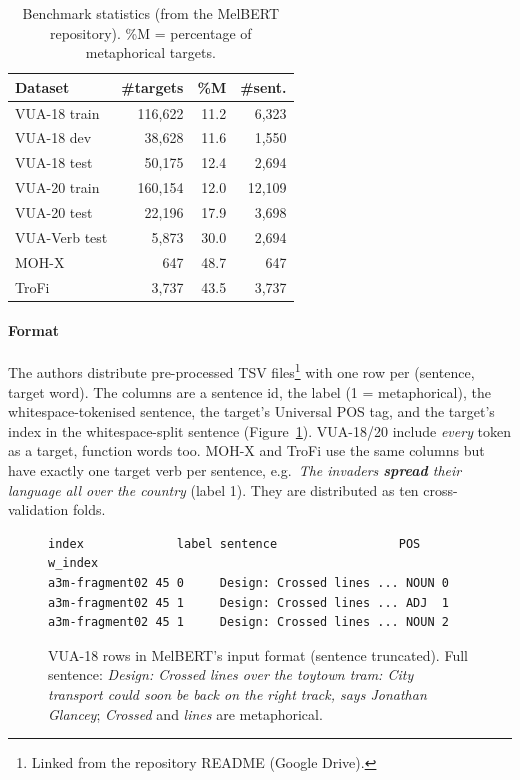 \documentclass[11pt]{article}
\begin{document}
\begin{table}[t]
\centering\small
\begin{tabular}{lrrr}
\toprule
Dataset & \#targets & \%M & \#sent. \\
\midrule
VUA-18 train & 116,622 & 11.2 & 6,323 \\
VUA-18 dev & 38,628 & 11.6 & 1,550 \\
VUA-18 test & 50,175 & 12.4 & 2,694 \\
VUA-20 train & 160,154 & 12.0 & 12,109 \\
VUA-20 test & 22,196 & 17.9 & 3,698 \\
VUA-Verb test & 5,873 & 30.0 & 2,694 \\
MOH-X & 647 & 48.7 & 647 \\
TroFi & 3,737 & 43.5 & 3,737 \\
\bottomrule
\end{tabular}
\caption{Benchmark statistics (from the MelBERT repository). \%M = percentage of metaphorical targets.}
\label{tab:origstats}
\end{table}

\paragraph{Format} The authors distribute pre-processed TSV files\footnote{Linked from the repository README (Google Drive).} with one row per (sentence, target word). The columns are a sentence id, the label (1 = metaphorical), the whitespace-tokenised sentence, the target's Universal POS tag, and the target's index in the whitespace-split sentence (Figure~\ref{fig:vuasnippet}). VUA-18/20 include \emph{every} token as a target, function words too. MOH-X and TroFi use the same columns but have exactly one target verb per sentence, e.g.\ \textit{The invaders \textbf{spread} their language all over the country} (label 1). They are distributed as ten cross-validation folds.

\begin{figure}[t]
\centering\scriptsize
\begin{BVerbatim}
index             label sentence                 POS  w_index
a3m-fragment02 45 0     Design: Crossed lines ... NOUN 0
a3m-fragment02 45 1     Design: Crossed lines ... ADJ  1
a3m-fragment02 45 1     Design: Crossed lines ... NOUN 2
\end{BVerbatim}
\caption{VUA-18 rows in MelBERT's input format (sentence truncated). Full sentence: \textit{Design: Crossed lines over the toytown tram: City transport could soon be back on the right track, says Jonathan Glancey}; \textit{Crossed} and \textit{lines} are metaphorical.}
\label{fig:vuasnippet}
\end{figure}
\end{document}
